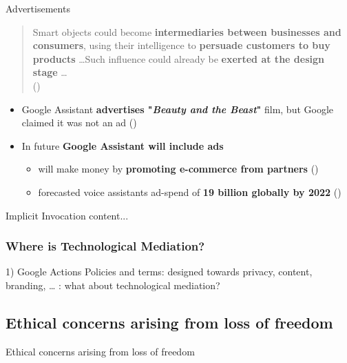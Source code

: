 \documentclass{beamer}
\begin{document}
\begin{frame}[allowframebreaks]
\begin{block}{Advertisements}
	\begin{quote}
		Smart objects could become
\textbf{intermediaries between businesses and consumers}, using their intelligence to \textbf{persuade customers to buy products} \dots Such influence could
already be \textbf{exerted at the design stage} \dots\\(\cite{brey2005freedom})
	\end{quote}

	\begin{itemize}
		\item Google Assistant \textbf{advertises "\emph{Beauty and the Beast}"} film, but Google claimed it was not an ad (\cite{androidPolice})
		\medskip
		\item In future \textbf{Google Assistant will include ads}
			\begin{itemize}
				\item will make money by \textbf{promoting e-commerce from partners} (\cite{recode})
				\item forecasted voice assistants ad-spend of \textbf{19 billion globally by 2022} (\cite{juniper})
			\end{itemize}
	\end{itemize}
	
\end{block}
\framebreak

\begin{block}{Implicit Invocation}
	content...
\end{block}
\end{frame}

\begin{frame}
\frametitle{Where is Technological Mediation? }
1) Google Actions Policies and terms: designed towards privacy, content, branding, … : what about technological mediation?
\end{frame}

\subsection{Ethical concerns arising from loss of freedom}
\begin{frame}
\begin{center} 
	 Ethical concerns arising from loss of freedom
\end{center}
\end{frame}
\end{document}
